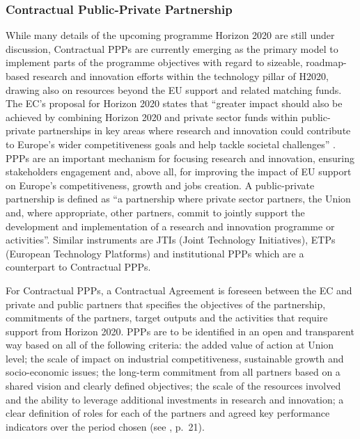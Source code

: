 \documentclass[10pt, plain]{../../metanetpaper}
\begin{document}
\begin{multicols}{2}

\subsubsection{Contractual Public-Private Partnership}
\label{sec:contr-ppp}

While many details of the upcoming programme Horizon 2020 are still under discussion, Contractual PPPs are currently emerging as the primary model to implement parts of the programme objectives with regard to sizeable, roadmap-based research and innovation efforts within the technology pillar of H2020, drawing also on resources beyond the EU support and related matching funds. The EC's proposal for Horizon 2020 states that ``greater impact should also be achieved by combining Horizon 2020 and private sector funds within public-private partnerships in key areas where research and innovation could contribute to Europe's wider competitiveness goals and help tackle societal challenges'' \cite{H2020prop}.  PPPs are an important mechanism for focusing research and innovation, ensuring stakeholders engagement and, above all, for improving the impact of EU support on Europe's competitiveness, growth and jobs creation. A public-private partnership is defined as ``a partnership where private sector partners, the Union and, where appropriate, other partners, commit to jointly support the development and implementation of a research and innovation programme or activities''. Similar instruments are JTIs (Joint Technology Initiatives), ETPs (European Technology Platforms) and institutional PPPs which are a counterpart to Contractual PPPs.

For Contractual PPPs, a Contractual Agreement is foreseen between the EC and private and public partners that specifies the objectives of the partnership, commitments of the partners, target outputs and the activities that require support from Horizon 2020. PPPs are to be identified in an open and transparent way based on all of the following criteria: the added value of action at Union level; the scale of impact on industrial competitiveness, sustainable growth and socio-economic issues; the long-term commitment from all partners based on a shared vision and clearly defined objectives; the scale of the resources involved and the ability to leverage additional investments in research and innovation; a clear definition of roles for each of the partners and agreed key performance indicators over the period chosen (see \cite{H2020prop}, p.~21).


\end{multicols}
\end{document}
